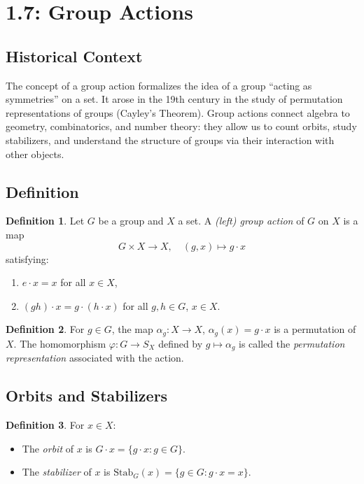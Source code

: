 \documentclass[12pt]{article}
\theoremstyle{definition}
\newtheorem{definition}{Definition}
\begin{document}
\dotfill
\section*{1.7: Group Actions}
\dotfill

\subsection*{Historical Context}
The concept of a group action formalizes the idea of a group ``acting as symmetries'' on a set.
It arose in the 19th century in the study of permutation representations of groups (Cayley’s Theorem).
Group actions connect algebra to geometry, combinatorics, and number theory:
they allow us to count orbits, study stabilizers, and understand the structure of groups via their
interaction with other objects.

\subsection*{Definition}
\begin{definition}
Let $G$ be a group and $X$ a set. A \emph{(left) group action} of $G$ on $X$ is a map
\[
G\times X \to X,\quad (g,x)\mapsto g\cdot x
\]
satisfying:
\begin{enumerate}
    \item $e\cdot x = x$ for all $x\in X$,
    \item $(gh)\cdot x = g\cdot(h\cdot x)$ for all $g,h\in G$, $x\in X$.
\end{enumerate}
\end{definition}

\begin{definition}
For $g\in G$, the map $\alpha_g:X\to X$, $\alpha_g(x)=g\cdot x$ is a permutation of $X$.
The homomorphism $\varphi:G\to S_X$ defined by $g\mapsto \alpha_g$ is called the
\emph{permutation representation} associated with the action.
\end{definition}

\subsection*{Orbits and Stabilizers}

\begin{definition}
For $x\in X$:
\begin{itemize}
    \item The \emph{orbit} of $x$ is $G\cdot x=\{g\cdot x:g\in G\}$.
    \item The \emph{stabilizer} of $x$ is $\mathrm{Stab}_G(x)=\{g\in G:g\cdot x=x\}$.
\end{itemize}
\end{definition}
\end{document}
